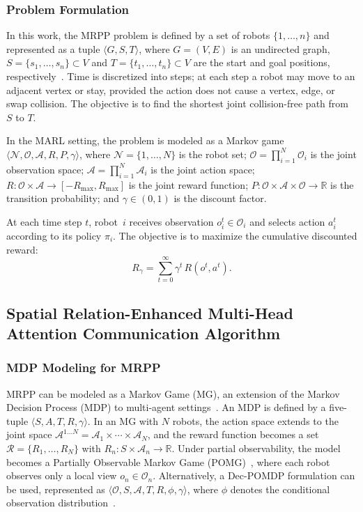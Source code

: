 \documentclass[conference]{IEEEtran}
\begin{document}
\subsubsection{Problem Formulation}

In this work, the MRPP problem is defined by a set of robots
$\{1,\ldots,n\}$ and represented as a tuple
$\langle G, S, T \rangle$, where $G=(V,E)$ is an undirected graph,
$S=\{s_1,\ldots,s_n\}\subset V$ and
$T=\{t_1,\ldots,t_n\}\subset V$ are the start and goal positions,
respectively~\cite{chung2024review}.
Time is discretized into steps; at each step a robot may move to
an adjacent vertex or stay, provided the action does not cause a
vertex, edge, or swap collision.
The objective is to find the shortest joint collision-free path
from $S$ to $T$.

In the MARL setting, the problem is modeled as a Markov game
$\langle \mathcal{N}, \mathcal{O}, \mathcal{A}, R, P, \gamma
\rangle$, where
$\mathcal{N}=\{1,\ldots,N\}$ is the robot set;
$\mathcal{O}=\prod_{i=1}^{N}\mathcal{O}_i$ is the joint
observation space;
$\mathcal{A}=\prod_{i=1}^{N}\mathcal{A}_i$ is the joint action
space;
$R:\mathcal{O}\times\mathcal{A}\to[-R_{\max},R_{\max}]$ is the
joint reward function;
$P:\mathcal{O}\times\mathcal{A}\times\mathcal{O}\to\mathbb{R}$
is the transition probability; and
$\gamma\in(0,1)$ is the discount factor.

At each time step $t$, robot~$i$ receives observation
$o_i^t\in\mathcal{O}_i$ and selects action $a_i^t$ according to
its policy $\pi_i$.
The objective is to maximize the cumulative discounted reward:
\begin{equation}\label{eq:return}
  R_\gamma = \sum_{t=0}^{\infty} \gamma^t\, R(o^t, a^t).
\end{equation}

\subsection{Spatial Relation-Enhanced Multi-Head Attention
Communication Algorithm}

\subsubsection{MDP Modeling for MRPP}

MRPP can be modeled as a Markov Game (MG), an extension of the
Markov Decision Process (MDP) to multi-agent
settings~\cite{huang2021strategic}.
An MDP is defined by a five-tuple $\langle S, A, T, R, \gamma
\rangle$.
In an MG with $N$ robots, the action space extends to the joint
space $\mathcal{A}^{1\ldots N}=\mathcal{A}_1\times\cdots\times
\mathcal{A}_N$, and the reward function becomes a set
$\mathcal{R}=\{R_1,\ldots,R_N\}$ with
$R_n:S\times\mathcal{A}_n\to\mathbb{R}$.
Under partial observability, the model becomes a Partially
Observable Markov Game
(POMG)~\cite{ma2021distributed}, where each robot observes only
a local view $o_n\in\mathcal{O}_n$.
Alternatively, a Dec-POMDP formulation can be used, represented as
$\langle \mathcal{O}, S, \mathcal{A}, T, R, \phi, \gamma
\rangle$, where $\phi$ denotes the conditional observation
distribution~\cite{guan2022abmapper}.
\end{document}

